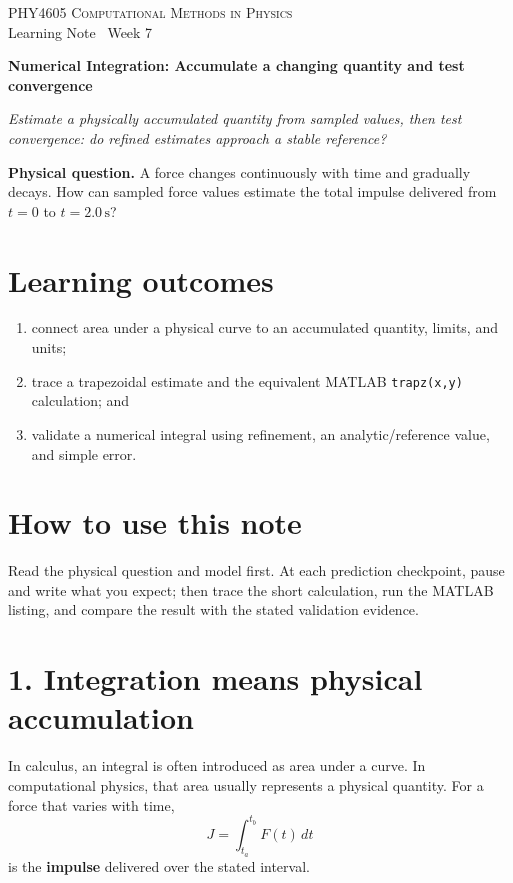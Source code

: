 \documentclass[11pt,a4paper]{article}
\newcommand{\course}{PHY4605 Computational Methods in Physics}
\newcommand{\units}[1]{\,\mathrm{#1}}
\begin{document}
{\large\textsc{\course}}\\[-2pt]
{\small Learning Note \textbar\ Week 7}\par\vspace{4pt}
{\LARGE\bfseries Numerical Integration: Accumulate a changing quantity and test convergence}\par\vspace{3pt}
\textit{Estimate a physically accumulated quantity from sampled values, then test convergence: do refined estimates approach a stable reference?}

\begin{keybox}\textbf{Physical question.} A force changes continuously with time and gradually decays. How can sampled force values estimate the total impulse delivered from $t=0$ to $t=2.0\units{s}$?\end{keybox}

\section*{Learning outcomes}
\begin{enumerate}[nosep,leftmargin=5mm]
\item connect area under a physical curve to an accumulated quantity, limits, and units;
\item trace a trapezoidal estimate and the equivalent MATLAB \texttt{trapz(x,y)} calculation; and
\item validate a numerical integral using refinement, an analytic/reference value, and simple error.
\end{enumerate}

\section*{How to use this note}
Read the physical question and model first. At each prediction checkpoint, pause and write what you expect; then trace the short calculation, run the MATLAB listing, and compare the result with the stated validation evidence.

\section*{1. Integration means physical accumulation}
In calculus, an integral is often introduced as area under a curve. In computational physics, that area usually represents a physical quantity. For a force that varies with time,
\[
J=\int_{t_a}^{t_b}F(t)\,dt
\]
is the \textbf{impulse} delivered over the stated interval.
\end{document}
